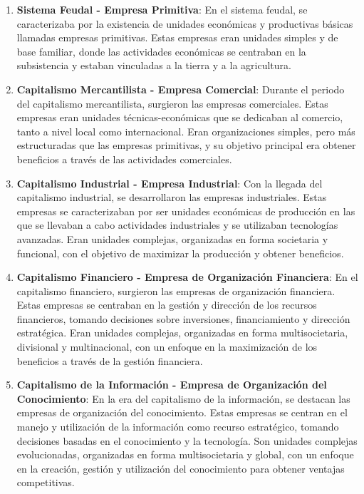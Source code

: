 \documentclass[
  a4paper,
]{article}
\begin{document}
\begin{enumerate}
\def\labelenumi{\arabic{enumi}.}
\item
  \textbf{Sistema Feudal - Empresa Primitiva}: En el sistema feudal, se
  caracterizaba por la existencia de unidades económicas y productivas
  básicas llamadas empresas primitivas. Estas empresas eran unidades
  simples y de base familiar, donde las actividades económicas se
  centraban en la subsistencia y estaban vinculadas a la tierra y a la
  agricultura.
\item
  \textbf{Capitalismo Mercantilista - Empresa Comercial}: Durante el
  periodo del capitalismo mercantilista, surgieron las empresas
  comerciales. Estas empresas eran unidades técnicas-económicas que se
  dedicaban al comercio, tanto a nivel local como internacional. Eran
  organizaciones simples, pero más estructuradas que las empresas
  primitivas, y su objetivo principal era obtener beneficios a través de
  las actividades comerciales.
\item
  \textbf{Capitalismo Industrial - Empresa Industrial}: Con la llegada
  del capitalismo industrial, se desarrollaron las empresas
  industriales. Estas empresas se caracterizaban por ser unidades
  económicas de producción en las que se llevaban a cabo actividades
  industriales y se utilizaban tecnologías avanzadas. Eran unidades
  complejas, organizadas en forma societaria y funcional, con el
  objetivo de maximizar la producción y obtener beneficios.
\item
  \textbf{Capitalismo Financiero - Empresa de Organización Financiera}:
  En el capitalismo financiero, surgieron las empresas de organización
  financiera. Estas empresas se centraban en la gestión y dirección de
  los recursos financieros, tomando decisiones sobre inversiones,
  financiamiento y dirección estratégica. Eran unidades complejas,
  organizadas en forma multisocietaria, divisional y multinacional, con
  un enfoque en la maximización de los beneficios a través de la gestión
  financiera.
\item
  \textbf{Capitalismo de la Información - Empresa de Organización del
  Conocimiento}: En la era del capitalismo de la información, se
  destacan las empresas de organización del conocimiento. Estas empresas
  se centran en el manejo y utilización de la información como recurso
  estratégico, tomando decisiones basadas en el conocimiento y la
  tecnología. Son unidades complejas evolucionadas, organizadas en forma
  multisocietaria y global, con un enfoque en la creación, gestión y
  utilización del conocimiento para obtener ventajas competitivas.
\end{enumerate}
\end{document}
